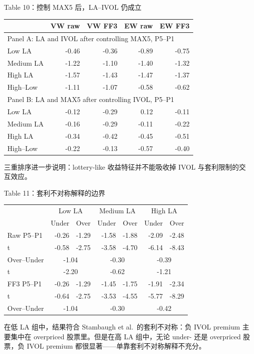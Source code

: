 \documentclass[aspectratio=169,10pt]{beamer}
\newcommand{\tighttable}{\scriptsize\setlength{\tabcolsep}{3pt}\renewcommand{\arraystretch}{1.12}}
\newcommand{\tinytab}{\tiny\setlength{\tabcolsep}{2.2pt}\renewcommand{\arraystretch}{1.08}}
\begin{document}
\begin{frame}{Table 10：控制 MAX5 后，LA--IVOL 仍成立}
	\tinytab
	\begin{tabular}{lrrrr}
		\toprule
		& VW raw & VW FF3 & EW raw & EW FF3\\
		\midrule
		\multicolumn{5}{l}{Panel A: LA and IVOL after controlling MAX5, P5--P1}\\
		Low LA & -0.46 & -0.36 & -0.89 & -0.75\\
		Medium LA & -1.22 & -1.10 & -1.40 & -1.32\\
		High LA & -1.57 & -1.43 & -1.47 & -1.37\\
		High--Low & -1.11 & -1.07 & -0.58 & -0.62\\
		\midrule
		\multicolumn{5}{l}{Panel B: LA and MAX5 after controlling IVOL, P5--P1}\\
		Low LA & -0.12 & -0.29 & 0.12 & -0.11\\
		Medium LA & -0.16 & -0.29 & -0.11 & -0.22\\
		High LA & -0.34 & -0.42 & -0.45 & -0.51\\
		High--Low & -0.22 & -0.13 & -0.57 & -0.40\\
		\bottomrule
	\end{tabular}
	\par\vspace{5pt}
	\small 三重排序进一步说明：lottery-like 收益特征并不能吸收掉 IVOL 与套利限制的交互效应。
\end{frame}

\begin{frame}{Table 11：套利不对称解释的边界}
	\tighttable
	\begin{tabular}{lrrrrrr}
		\toprule
		& \multicolumn{2}{c}{Low LA} & \multicolumn{2}{c}{Medium LA} & \multicolumn{2}{c}{High LA}\\
		& Under & Over & Under & Over & Under & Over\\
		\midrule
		Raw P5--P1 & -0.26 & -1.29 & -1.58 & -1.88 & -2.09 & -2.48\\
		t & -0.58 & -2.75 & -3.58 & -4.70 & -6.14 & -8.43\\
		Over--Under & \multicolumn{2}{c}{-1.04} & \multicolumn{2}{c}{-0.30} & \multicolumn{2}{c}{-0.39}\\
		t & \multicolumn{2}{c}{-2.20} & \multicolumn{2}{c}{-0.62} & \multicolumn{2}{c}{-1.21}\\
		\midrule
		FF3 P5--P1 & -0.26 & -1.29 & -1.45 & -1.75 & -1.91 & -2.34\\
		t & -0.64 & -2.75 & -3.53 & -4.55 & -5.77 & -8.29\\
		Over--Under & \multicolumn{2}{c}{-1.04} & \multicolumn{2}{c}{-0.30} & \multicolumn{2}{c}{-0.42}\\
		\bottomrule
	\end{tabular}
	\par\vspace{5pt}
	\small 在低 LA 组中，结果符合 Stambaugh et al.\ 的套利不对称：负 IVOL premium 主要集中在 overpriced 股票里。但是在高 LA 组中，无论 under- 还是 overpriced 股票，负 IVOL premium 都很显著——单靠套利不对称解释不充分。
\end{frame}
\end{document}
